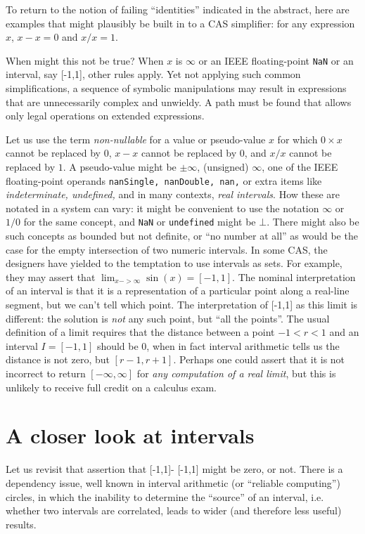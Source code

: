 \documentclass{article}
\begin{document}
To return to the notion of failing ``identities'' indicated in the
abstract, here are examples that might plausibly be built in to a CAS
simplifier: for any expression $x$, $x - x = 0$ and $x/x = 1$.  

When might this not be true?  When $x$ is $\infty$ or an IEEE
floating-point {\tt NaN} or an interval, say [-1,1], other rules apply.  Yet not
applying such common simplifications, a sequence of symbolic manipulations
may result in expressions that are unnecessarily complex
and unwieldy. A path must be found that allows only legal operations on extended
expressions.  

Let us use the term {\em non-nullable} for a value or pseudo-value $x$
for which $0 \times x$ cannot be replaced by $0$, $x-x$ cannot be
replaced by $0$, and $x/x$ cannot be replaced by $1$.  A pseudo-value
might be $\pm \infty$, (unsigned) $\infty$, one of the IEEE
floating-point operands {\tt nanSingle, nanDouble, nan,} or extra
items like {\em indeterminate, undefined,} and in many contexts, {\em
real intervals}.  How these are notated in a system can vary: it might
be convenient to use the notation $\infty$ or $1/0$ for the same
concept, and {\tt NaN} or {\tt undefined} might be $\bot$.  There
might also be such concepts as bounded but not definite, or ``no
number at all'' as would be the case for the empty intersection of two
numeric intervals. In some CAS, the designers have yielded to the
temptation to use intervals as sets.  For example, they may assert
that $\lim_{x->\infty}\sin(x) = [-1,1]$. The nominal interpretation of
an interval is that it is a representation of a particular point along
a real-line segment, but we can't tell which point.  The
interpretation of [-1,1] as this limit is different: the solution is
{\em not} any such point, but ``all the points''. The usual definition
of a limit requires that the distance between a point $-1<r<1$ and an
interval $I=[-1,1]$ should be 0, when in fact interval arithmetic
tells us the distance is not zero, but $[r-1,r+1]$. Perhaps one could
assert that it is not incorrect to return $[-\infty, \infty]$ for {\em
any computation of a real limit}, but this is unlikely to receive full
credit on a calculus exam.
\medskip

\section{A closer look at intervals}

Let us revisit that assertion that [-1,1]- [-1,1] might be zero, or
not.  There is a dependency issue, well known in interval arithmetic
(or ``reliable computing'') circles, in which the inability to
determine the ``source'' of an interval, i.e. whether two intervals
are correlated, leads to wider (and therefore less useful) results.
\end{document}
